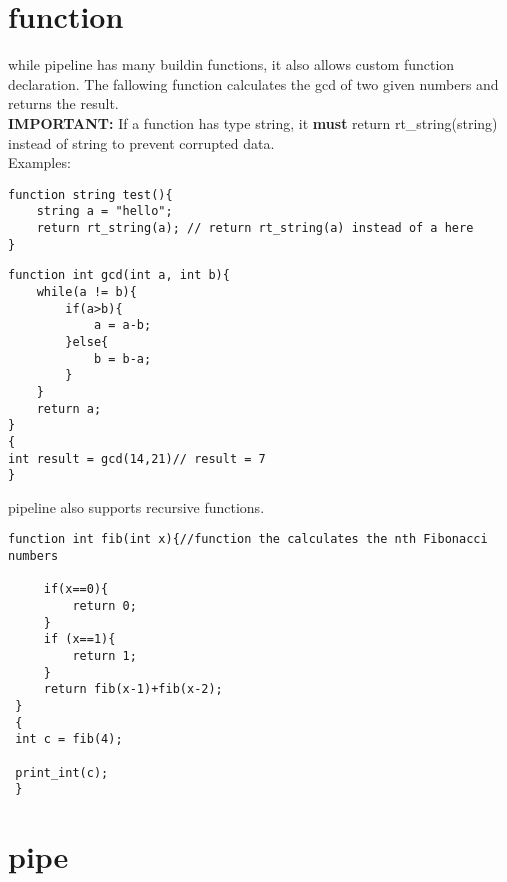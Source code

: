 \documentclass[./Report_main.tex]{subfiles}
\begin{document}
\section{function}
while pipeline has many buildin functions, it also allows custom function declaration. The fallowing function calculates the gcd of two given numbers and returns the result.\\
\textbf{IMPORTANT:} If a function has type string, it \textbf{must} return rt\_string(string) instead of string to prevent corrupted data.\\
Examples:\\
\begin{lstlisting}
function string test(){
    string a = "hello";
    return rt_string(a); // return rt_string(a) instead of a here
}
\end{lstlisting}
\begin{lstlisting}
function int gcd(int a, int b){
    while(a != b){
        if(a>b){
            a = a-b;
        }else{
            b = b-a;
        }
    }
    return a;
}
{
int result = gcd(14,21)// result = 7
}
\end{lstlisting}
pipeline also supports recursive functions.\\
\begin{lstlisting}
function int fib(int x){//function the calculates the nth Fibonacci numbers
 
     if(x==0){
         return 0;
     }
     if (x==1){
         return 1;
     }
     return fib(x-1)+fib(x-2);
 }
 {
 int c = fib(4);
 
 print_int(c);
 }
\end{lstlisting}
\section{pipe}
\end{document}
